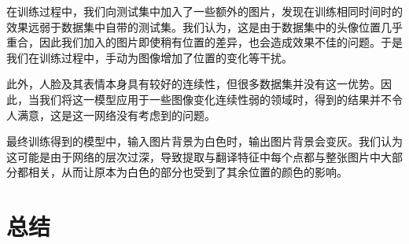\documentclass[UTF8,a4paper，12pt]{article}
\theoremstyle{theorem}
\theoremstyle{definition}
\begin{document}
在训练过程中，我们向测试集中加入了一些额外的图片，发现在训练相同时间时的效果远弱于数据集中自带的测试集。我们认为，这是由于数据集中的头像位置几乎重合，因此我们加入的图片即使稍有位置的差异，也会造成效果不佳的问题。于是我们在训练过程中，手动为图像增加了位置的变化等干扰。

此外，人脸及其表情本身具有较好的连续性，但很多数据集并没有这一优势。因此，当我们将这一模型应用于一些图像变化连续性弱的领域时，得到的结果并不令人满意，这是这一网络没有考虑到的问题。

最终训练得到的模型中，输入图片背景为白色时，输出图片背景会变灰。我们认为这可能是由于网络的层次过深，导致提取与翻译特征中每个点都与整张图片中大部分都相关，从而让原本为白色的部分也受到了其余位置的颜色的影响。

\section{总结}
\end{document}
